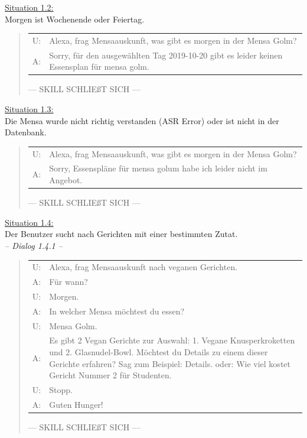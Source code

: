 \documentclass[12pt]{article}
\begin{document}
\ul{Situation 1.2:}\\Morgen ist Wochenende oder Feiertag.
\begin{quote}
\begin{tabular}{lp{12cm}}
  U:& Alexa, frag Mensaauskunft, was gibt es morgen in der Mensa Golm?\\  
  A:& Sorry, für den ausgewählten Tag 2019-10-20 gibt es leider keinen Essensplan für mensa golm.\\[0.2cm]  
\end{tabular}
--- SKILL SCHLIEßT SICH ---\\
\end{quote}

\newpage

\ul{Situation 1.3:}\\Die Mensa wurde nicht richtig verstanden (ASR Error) oder ist nicht in der Datenbank.

\begin{quote}
\begin{tabular}{lp{12cm}}
  U:& Alexa, frag Mensaauskunft, was gibt es morgen in der Mensa Golm?\\
  A:& Sorry, Essenspläne für mensa golum habe ich leider nicht im Angebot.\\[0.2cm]
\end{tabular}
--- SKILL SCHLIEßT SICH ---\\
\end{quote}

\ul{Situation 1.4:}\\Der Benutzer sucht nach Gerichten mit einer bestimmten Zutat.\\
\emph{-- Dialog 1.4.1 --}
\begin{quote}
\begin{tabular}{lp{12cm}}
  U:& Alexa, frag Mensaauskunft nach veganen Gerichten.\\
  A:& Für wann?\\
  U:& Morgen.\\
  A:& In welcher Mensa möchtest du essen?\\
  U:& Mensa Golm.\\
  A:& Es gibt 2 Vegan Gerichte zur Auswahl: 1. Vegane Knusperkroketten und 2. Glasnudel-Bowl. Möchtest du Details zu einem dieser Gerichte erfahren? Sag zum Beispiel: Details. oder: Wie viel kostet Gericht Nummer 2 für Studenten.\\
  U:& Stopp.\\
  A:& Guten Hunger!\\[0.2cm]
\end{tabular}
--- SKILL SCHLIEßT SICH ---\\
\end{quote}
\end{document}
